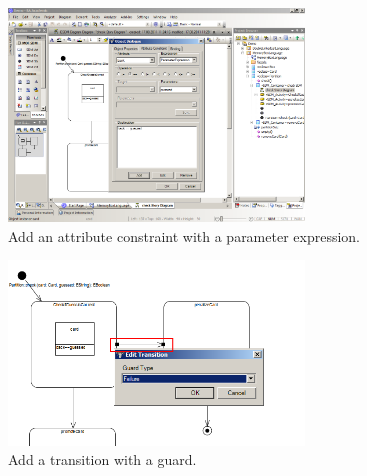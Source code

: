 \begin{figure}[htp]
\begin{center}
  \includegraphics[width=0.7\textwidth]{pics/sdmBilder/check/sdm18RAW}
  \caption{Add an attribute constraint with a parameter expression.}  
  \label{fig:sdm_check_att_constraint}
\end{center}
\end{figure} 

\begin{figure}[htp]
\begin{center}
  \includegraphics[width=0.7\textwidth]{pics/sdmBilder/check/sdm19}
  \caption{Add a transition with a guard.}  
  \label{fig:sdm_check_guard}
\end{center}
\end{figure}

